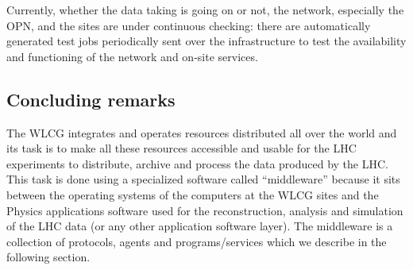 Currently, whether the data taking is going on or not, the network,
especially the OPN, and the sites are under continuous checking:
there  are automatically generated test jobs periodically sent over
the infrastructure to test the availability and functioning of the
network and on-site services.

\subsection{Concluding remarks}
%
The WLCG integrates and operates resources distributed all over the
world and its task is to make all these resources accessible and
usable for the LHC experiments to distribute, archive and process
the data produced by the LHC. This task is done using a specialized
software called ``middleware'' because it sits between the operating
systems of the computers at the WLCG sites and the Physics
applications software used for the reconstruction, analysis and
simulation of the LHC data (or any other application software
layer). The middleware is a collection of protocols, agents and
programs/services which we describe in the following section.

